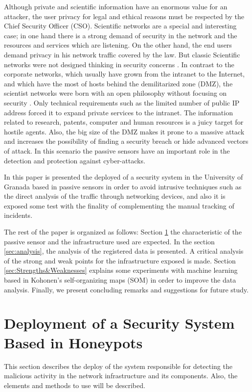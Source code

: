 \documentclass[a4paper]{llncs}
\begin{document}
Although private and scientific information have an enormous value for an attacker, the user privacy for legal and ethical reasons must be respected by the Chief Security Officer (CSO). Scientific networks are a special and interesting case; in one hand there is a strong demand of security in the network and the resources and services which are listening. On the other hand, the end users demand privacy in his network traffic covered by the law. But classic Scientific networks were not designed thinking in security concerns \cite{iris-proyecto}. In contrast to the corporate networks, which usually have grown from the intranet to the Internet, and which have the most of hosts behind the demilitarized zone (DMZ), the scientist networks were born with an open philosophy without focusing on security \cite{iris-proyecto}. Only technical requirements such as the limited number of public IP address forced it to expand private services to the intranet. The information related to research, patents, computer and human resources is a juicy target for hostile agents. Also, the big size of the DMZ makes it prone to a massive attack and increases the possibility of finding a security breach or hide advanced vectors of attack. In this scenario the passive sensors have an important role in the detection and protection against cyber-attacks.

In this paper is presented the deployed of a security system in the University of Granada based in passive sensors in order to avoid intrusive techniques such as the direct analysis of the traffic through networking devices, and also it is exposed some test with the finality of complementing the manual tracking of incidents.

The rest of the paper is organized as follows: Section \ref{sec:deployment} the characteristic of the passive sensor and the infrastructure used are expected. In the section \ref{sec:analysis}, the analysis of the registered data is presented. A critical analysis of the strong and weak points for the infrastructure exposed is made. Section \ref{sec:Strengths&Weaknesses} explains some experiments with machine learning based in Kohonen's self-organizing maps (SOM) \cite{kohonen-1990} in order to improve the data analysis. Finally, we present concluding remarks and suggestions for future study.


\section{Deployment of a Security System Based in Honeypots}
\label{sec:deployment}
This section describes the deploy of the system responsible for detecting the malicious activity in the network infrastructure and its components. Also, the elements and methods to use will be described.
\end{document}
